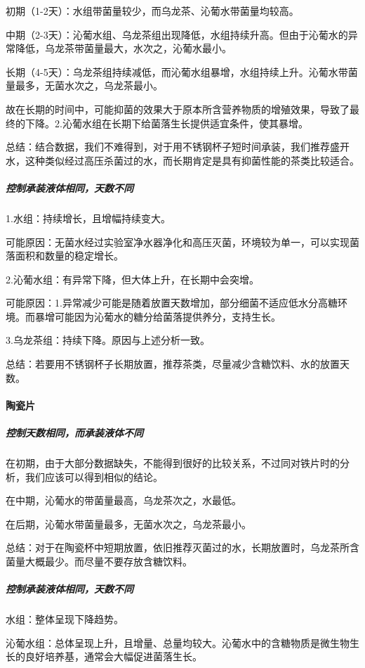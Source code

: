 \documentclass[12pt,a4paper]{ctexart}
\begin{document}
初期（1-2天）：水组带菌量较少，而乌龙茶、沁葡水带菌量均较高。

中期（2-3天）：沁葡水组、乌龙茶组出现降低，水组持续升高。但由于沁葡水的异常降低，乌龙茶带菌量最大，水次之，沁葡水最小。

长期（4-5天）：乌龙茶组持续减低，而沁葡水组暴增，水组持续上升。沁葡水带菌量最多，无菌水次之，乌龙茶最小。



故在长期的时间中，可能抑菌的效果大于原本所含营养物质的增殖效果，导致了最终的下降。2.沁葡水组在长期下给菌落生长提供适宜条件，使其暴增。

总结：结合数据，我们不难得到，对于用不锈钢杯子短时间承装，我们推荐盛开水，这种类似经过高压杀菌过的水，而长期肯定是具有抑菌性能的茶类比较适合。

\subparagraph{控制承装液体相同，天数不同}

1.水组：持续增长，且增幅持续变大。

可能原因：无菌水经过实验室净水器净化和高压灭菌，环境较为单一，可以实现菌落面积和数量的稳定增长。

2.沁葡水组：有异常下降，但大体上升，在长期中会突增。

可能原因：1.异常减少可能是随着放置天数增加，部分细菌不适应低水分高糖环境。而暴增可能因为沁葡水的糖分给菌落提供养分，支持生长。

3.乌龙茶组：持续下降。原因与上述分析一致。

总结：若要用不锈钢杯子长期放置，推荐茶类，尽量减少含糖饮料、水的放置天数。

\paragraph{陶瓷片}
\subparagraph{控制天数相同，而承装液体不同}
 
在初期，由于大部分数据缺失，不能得到很好的比较关系，不过同对铁片时的分析，我们应该可以得到相似的结论。
 
在中期，沁葡水的带菌量最高，乌龙茶次之，水最低。


 
在后期，沁葡水带菌量最多，无菌水次之，乌龙茶最小。

总结：对于在陶瓷杯中短期放置，依旧推荐灭菌过的水，长期放置时，乌龙茶所含菌量大概最少。而尽量不要存放含糖饮料。
 
 
\subparagraph{控制承装液体相同，天数不同}
 
水组：整体呈现下降趋势。
 
沁葡水组：总体呈现上升，且增量、总量均较大。沁葡水中的含糖物质是微生物生长的良好培养基，通常会大幅促进菌落生长。
 
\end{document}
